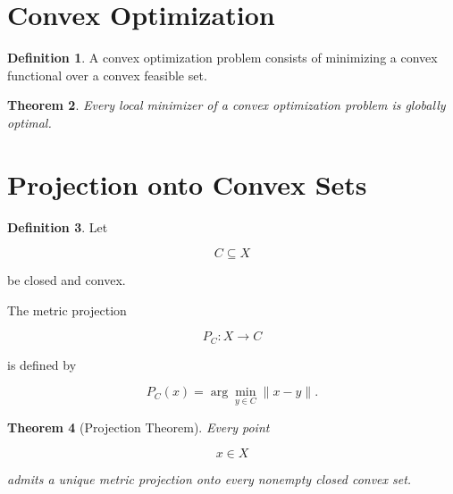 \documentclass[11pt]{book}
\numberwithin{equation}{chapter}
\theoremstyle{definition}
\newtheorem{definition}{Definition}[chapter]
\theoremstyle{plain}
\newtheorem{theorem}[definition]{Theorem}
\begin{document}

\section{Convex Optimization}

\begin{definition}

A convex optimization problem consists of minimizing a convex functional
over a convex feasible set.

\end{definition}


\begin{theorem}

Every local minimizer of a convex optimization problem is globally
optimal.

\end{theorem}


\section{Projection onto Convex Sets}

\begin{definition}

Let

\[
C
\subseteq
X
\]

be closed and convex.

The metric projection

\[
P_C:X\rightarrow C
\]

is defined by

\[
P_C(x)
=
\arg\min_{y\in C}
\|x-y\|.
\]

\end{definition}


\begin{theorem}[Projection Theorem]

Every point

\[
x\in X
\]

admits a unique metric projection onto every nonempty closed convex set.

\end{theorem}
\end{document}
